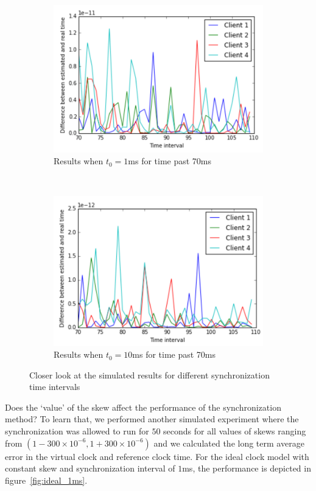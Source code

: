 \documentclass[10pt, journal, letter, onecolumn]{IEEEtran}
\begin{document}
\begin{figure}
\begin{subfigure}[b]{0.48\textwidth}
\centering
\includegraphics[scale=0.5]{figures/figure5}
\caption{Results when $t_0 = 1$ms for time past 70ms}
\label{fig:results2_1ms}
\end{subfigure}~
\begin{subfigure}[b]{0.48\textwidth}
\centering
\includegraphics[scale=0.5]{figures/figure6}
\caption{Results when $t_0 = 10$ms for time past 70ms}
\label{fig:results2_10ms}
\end{subfigure}
\caption{Closer look at the simulated results for different synchronization time intervals}
\label{fig:results2}
\end{figure}

Does the `value' of the skew affect the performance of the synchronization method? To learn that, we performed another simulated experiment where the synchronization was allowed to run for $50$ seconds for all values of skews ranging from $\left(1 - 300\times 10^{-6}, 1 + 300 \times 10^{-6}\right)$ and we calculated the long term average error in the virtual clock and reference clock time. For the ideal clock model with constant skew and synchronization interval of $1$ms, the performance is depicted in figure~\ref{fig:ideal_1ms}.
\end{document}
